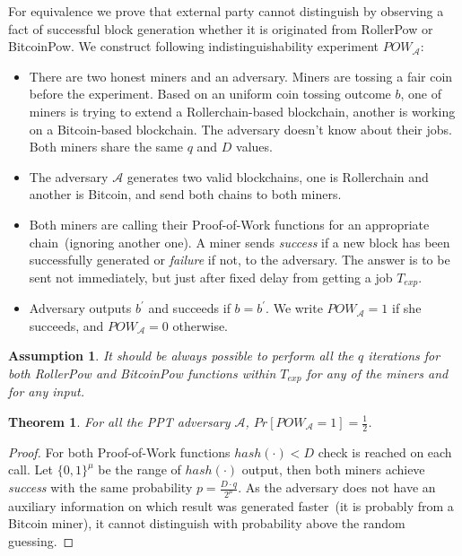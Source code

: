 \documentclass[conference,compsoc]{IEEEtran}
\newtheorem{theorem}{Theorem}
\newtheorem{assumption}{Assumption}
\begin{document}
 For equivalence we prove that external party cannot distinguish by observing a fact of successful block generation whether it is originated from RollerPow or BitcoinPow. We construct following indistinguishability experiment \(POW_{\mathcal{A}}\):


\begin{itemize}
\item There are two honest miners and an adversary. Miners are tossing a fair coin before the experiment. Based on an uniform coin tossing outcome \(b\), one of miners is trying to extend a Rollerchain-based blockchain, another is working on a Bitcoin-based blockchain. The adversary doesn't know about their jobs. Both miners share the same \(q\) and \(D\) values.
\item The adversary \(\mathcal{A}\) generates two valid blockchains, one is Rollerchain and another is Bitcoin, and send both chains to both miners.
\item Both miners are calling their Proof-of-Work functions for an appropriate chain~(ignoring another one). A miner sends \textit{success} if a new block has been successfully generated or \textit{failure} if not, to the adversary. The answer is to be sent not immediately, but just after fixed delay from getting a job \(T_{exp}\).
\item Adversary outputs \(b^\prime\) and succeeds if \(b = b^\prime\). We write \(POW_{\mathcal{A}} = 1\) if she succeeds, and \(POW_{\mathcal{A}} = 0\) otherwise.
\end{itemize}

\begin{assumption}
\label{assume_q}
It should be always possible to perform all the \(q\) iterations for both RollerPow and BitcoinPow functions within \(T_{exp}\) for any of the miners and for any input.
\end{assumption}

\begin{theorem}
For all the PPT adversary \(\mathcal{A}\), \(Pr[POW_{\mathcal{A}} = 1] = \frac{1}{2}\).
\end{theorem}
\begin{proof}
For both Proof-of-Work functions \(hash(\cdot) < D\) check is reached on each call. Let \(\{0,1\}^\mu\) be the range of \(hash(\cdot)\) output, then both miners achieve \textit{success} with the same probability \(p = \frac{D \cdot q}{2^\mu}\). As the adversary does not have an auxiliary information on which result was generated faster~(it is probably from a Bitcoin miner), it cannot distinguish with probability above the random guessing.
\end{proof}
\end{document}
